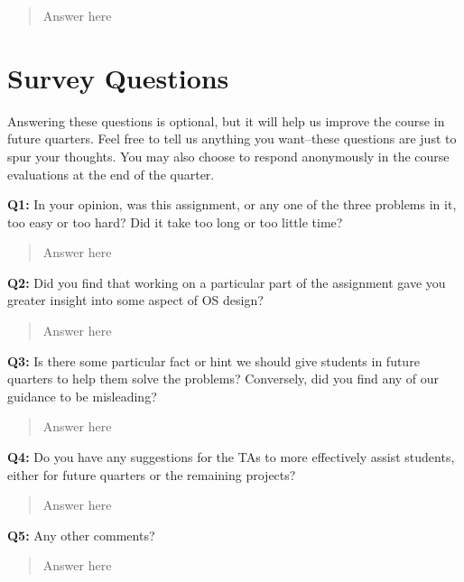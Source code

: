 \documentclass[a4paper,11pt]{paper}
\begin{document}
\begin{quote}
  Answer here
\end{quote}




\section{Survey Questions}

Answering these questions is optional, but it will help us improve the course in future quarters.  Feel free to tell us anything you want--these questions are just to spur your thoughts.  You may also choose to respond anonymously in the course evaluations at the end of the quarter.

\textbf{Q1:} In your opinion, was this assignment, or any one of the three problems in it, too easy or too hard?  Did it take too long or too little time?
\begin{quote}
  Answer here
\end{quote}

\textbf{Q2:} Did you find that working on a particular part of the assignment gave you greater insight into some aspect of OS design?
\begin{quote}
  Answer here
\end{quote}

\textbf{Q3:} Is there some particular fact or hint we should give students in future quarters to help them solve the problems?  Conversely, did you find any of our guidance to be misleading?
\begin{quote}
  Answer here
\end{quote}

\textbf{Q4:} Do you have any suggestions for the TAs to more effectively assist students, either for future quarters or the remaining projects?
\begin{quote}
  Answer here
\end{quote}

\textbf{Q5:} Any other comments?
\begin{quote}
  Answer here
\end{quote}
\end{document}
